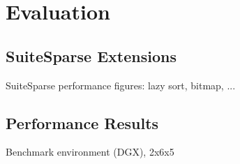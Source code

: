 \section{Evaluation}
\label{sec:evaluation}


\subsection{SuiteSparse Extensions}

SuiteSparse performance figures: lazy sort, bitmap, ...

\subsection{Performance Results}

Benchmark environment (DGX), 2x6x5
